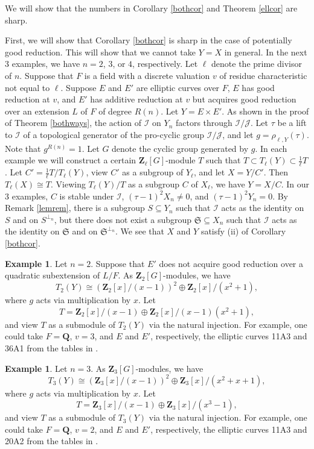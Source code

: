 \documentclass{amsart}
\def\Q{{\mathbf Q}}
\def\Z{{\mathbf Z}}
\def\I{{\mathcal I}}
\def\J{{\mathcal J}}
\def\s{{\mathfrak S}}
\theoremstyle{definition}
\newtheorem{ex}[thm]{Example}
\begin{document}
We will show that the numbers in Corollary \ref{bothcor}
and Theorem \ref{ellcor} are sharp. 

First, we will show that Corollary \ref{bothcor} is sharp in the case of
potentially good reduction. This will show that we cannot take
$Y = X$ in general.
In the next 3 examples, we have $n = 2$, $3$, or $4$, respectively.
Let $\ell$ denote the prime divisor of $n$. 
Suppose that $F$ is a field with a discrete valuation $v$ of 
residue characteristic not equal to $\ell$. Suppose $E$
and $E'$ are elliptic curves over $F$, $E$ has good reduction
at $v$, and $E'$ has additive reduction at $v$ but
acquires good reduction over an extension $L$ of $F$ of degree
$R(n)$.
Let $Y = E \times E'$. 
As shown in the proof of Theorem \ref{bothways}, 
the action of $\I$ on $Y_n$ factors through
$\I/\J$. Let $\tau$ be a lift to $\I$ of a topological 
generator of the pro-cyclic group $\I/\J$, and 
let $g = \rho_{\ell,Y}(\tau)$. Note that $g^{R(n)} = 1$.
Let $G$ denote the cyclic group generated by $g$.
In each example we will construct 
a certain $\Z_{\ell}[G]$-module $T$ such that 
$T \subset T_\ell(Y) \subset \frac{1}{\ell}T$.
Let $C' = \frac{1}{\ell}T/T_\ell(Y)$, 
view $C'$ as a subgroup of $Y_\ell$,
and let $X = Y/C'$. Then $T_\ell(X) \cong T$.
Viewing $T_{\ell}(Y)/T$ as a subgroup
$C$ of $X_{\ell}$, we have $Y = X/C$. 
In our 3 examples, $C$ is stable under $\I$, 
$(\tau - 1)^2X_n \ne 0$, and $(\tau - 1)^2Y_n = 0$. 
By Remark \ref{lemrem}, there is a subgroup $S \subseteq Y_n$
such that $\I$ acts as the identity on $S$ and on $S^{\perp_n}$, 
but there does not exist a subgroup $\s \subseteq X_n$
such that $\I$ acts as the identity on $\s$ and on $\s^{\perp_n}$.
We see that $X$ and $Y$ satisfy (ii) of Corollary \ref{bothcor}.

\begin{ex}
\label{exfor2}
Let $n = 2$. Suppose that $E'$ does not acquire good reduction
over a quadratic subextension of $L/F$. 
As $\Z_{2}[G]$-modules, we have 
$$T_2(Y) \cong 
(\Z_2[x]/(x-1))^2 \oplus \Z_2[x]/(x^2+1),$$
where $g$ acts via multiplication by $x$.
Let 
$$T = \Z_2[x]/(x-1) \oplus \Z_2[x]/(x-1)(x^2+1),$$ and 
view $T$ as a submodule of $T_2(Y)$ via the natural injection.
For example, one could take $F = \Q$, $v = 3$, 
and $E$ and $E'$, respectively, the elliptic curves 11A3 and
36A1 from the tables in \cite{Cremona}.
\end{ex}

\begin{ex}
\label{exfor3}
Let $n = 3$. 
As $\Z_{3}[G]$-modules, we have 
$$T_3(Y) \cong
(\Z_3[x]/(x-1))^2 \oplus \Z_3[x]/(x^2+x+1),$$
where $g$ acts via multiplication by $x$.
Let 
$$T = \Z_3[x]/(x-1) \oplus \Z_3[x]/(x^3-1),$$
and 
view $T$ as a submodule of $T_3(Y)$ via the natural injection.
For example, one could take $F = \Q$, $v = 2$, 
and $E$ and $E'$, respectively, the elliptic curves 11A3 and
20A2 from the tables in \cite{Cremona}.
\end{ex}
\end{document}
